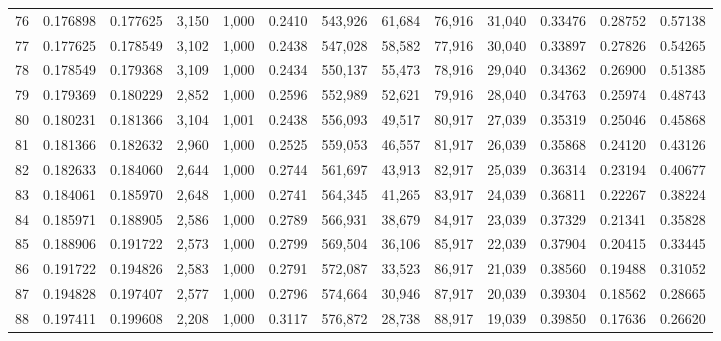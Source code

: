 \begin{tabular}{rrrrrrrrrrrrr}
76  &  0.176898 &  0.177625 &   3,150 &  1,000 &                                     0.2410 &  543,926 &   61,684 &   76,916 &   31,040 &  0.33476 &  0.28752 &  0.57138 \\
77  &  0.177625 &  0.178549 &   3,102 &  1,000 &                                     0.2438 &  547,028 &   58,582 &   77,916 &   30,040 &  0.33897 &  0.27826 &  0.54265 \\
78  &  0.178549 &  0.179368 &   3,109 &  1,000 &                                     0.2434 &  550,137 &   55,473 &   78,916 &   29,040 &  0.34362 &  0.26900 &  0.51385 \\
79  &  0.179369 &  0.180229 &   2,852 &  1,000 &                                     0.2596 &  552,989 &   52,621 &   79,916 &   28,040 &  0.34763 &  0.25974 &  0.48743 \\
80  &  0.180231 &  0.181366 &   3,104 &  1,001 &                                     0.2438 &  556,093 &   49,517 &   80,917 &   27,039 &  0.35319 &  0.25046 &  0.45868 \\
81  &  0.181366 &  0.182632 &   2,960 &  1,000 &                                     0.2525 &  559,053 &   46,557 &   81,917 &   26,039 &  0.35868 &  0.24120 &  0.43126 \\
82  &  0.182633 &  0.184060 &   2,644 &  1,000 &                                     0.2744 &  561,697 &   43,913 &   82,917 &   25,039 &  0.36314 &  0.23194 &  0.40677 \\
83  &  0.184061 &  0.185970 &   2,648 &  1,000 &                                     0.2741 &  564,345 &   41,265 &   83,917 &   24,039 &  0.36811 &  0.22267 &  0.38224 \\
84  &  0.185971 &  0.188905 &   2,586 &  1,000 &                                     0.2789 &  566,931 &   38,679 &   84,917 &   23,039 &  0.37329 &  0.21341 &  0.35828 \\
85  &  0.188906 &  0.191722 &   2,573 &  1,000 &                                     0.2799 &  569,504 &   36,106 &   85,917 &   22,039 &  0.37904 &  0.20415 &  0.33445 \\
86  &  0.191722 &  0.194826 &   2,583 &  1,000 &                                     0.2791 &  572,087 &   33,523 &   86,917 &   21,039 &  0.38560 &  0.19488 &  0.31052 \\
87  &  0.194828 &  0.197407 &   2,577 &  1,000 &                                     0.2796 &  574,664 &   30,946 &   87,917 &   20,039 &  0.39304 &  0.18562 &  0.28665 \\
88  &  0.197411 &  0.199608 &   2,208 &  1,000 &                                     0.3117 &  576,872 &   28,738 &   88,917 &   19,039 &  0.39850 &  0.17636 &  0.26620 \\

\end{tabular}
